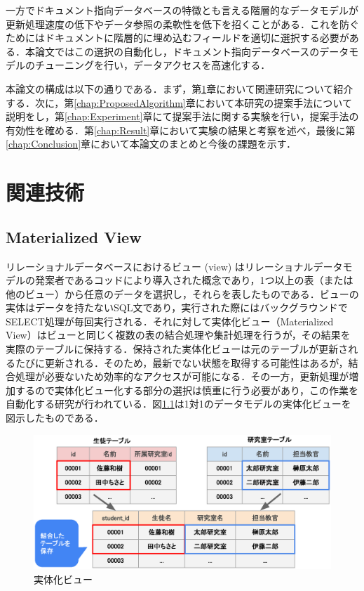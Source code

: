 \documentclass[a4paper,11pt]{ujreport}
\begin{document}
一方でドキュメント指向データベースの特徴とも言える階層的なデータモデルが更新処理速度の低下やデータ参照の柔軟性を低下を招くことがある．これを防ぐためにはドキュメントに階層的に埋め込むフィールドを適切に選択する必要がある．本論文ではこの選択の自動化し，ドキュメント指向データベースのデータモデルのチューニングを行い，データアクセスを高速化する．

本論文の構成は以下の通りである．まず，第\ref{chap:LiteratureReview}章において関連研究について紹介する．次に，第\ref{chap:ProposedAlgorithm}章において本研究の提案手法について説明をし，第\ref{chap:Experiment}章にて提案手法に関する実験を行い，提案手法の有効性を確める．第\ref{chap:Result}章において実験の結果と考察を述べ，最後に第\ref{chap:Conclusion}章において本論文のまとめと今後の課題を示す．

\chapter{関連技術}
\label{chap:LiteratureReview}
\section{Materialized View}
リレーショナルデータベースにおけるビュー (view) はリレーショナルデータモデルの発案者であるコッドにより導入された概念であり\cite{Codd1974RecentII}，1つ以上の表（または他のビュー）から任意のデータを選択し，それらを表したものである．ビューの実体はデータを持たないSQL文であり，実行された際にはバックグラウンドでSELECT処理が毎回実行される．それに対して実体化ビュー（Materialized View）はビューと同じく複数の表の結合処理や集計処理を行うが，その結果を実際のテーブルに保持する．保持された実体化ビューは元のテーブルが更新されるたびに更新される．そのため，最新でない状態を取得する可能性はあるが，結合処理が必要ないため効率的なアクセスが可能になる．その一方，更新処理が増加するので実体化ビュー化する部分の選択は慎重に行う必要があり，この作業を自動化する研究が行われている\cite{mistry2001materialized}．図\ref{figure:MvDescription}は1対1のデータモデルの実体化ビューを図示したものである．
\begin{figure}[htbp]
	\begin{center}
		\includegraphics[width=32em, trim=0 5em 0 0]{src/MvDescription.eps} %
	\end{center}
	\caption{実体化ビュー}
	\label{figure:MvDescription}
\end{figure}
\end{document}
